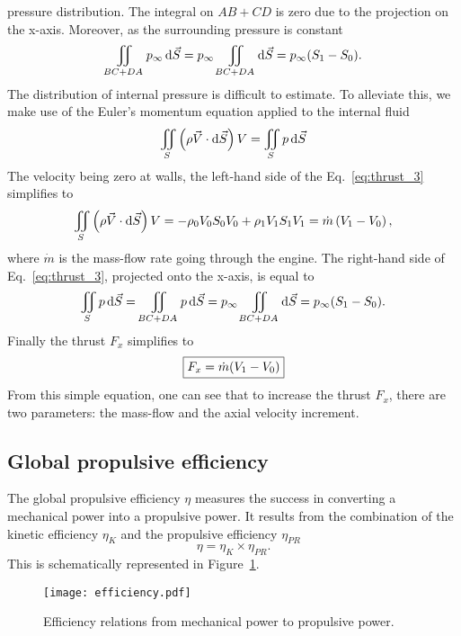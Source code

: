 pressure distribution. The integral on
$AB + CD$ is zero due to the projection on
the x-axis.
Moreover, as the surrounding pressure is constant
\begin{equation}
	\iint_{BC + DA} p_{\infty} \diff \vec{S} =
	p_{\infty} \iint_{BC + DA} \diff \vec{S} =
	p_{\infty} (S_{1} - S_{0}).
	\label{eq:thrust_2}
\end{equation}
The distribution of internal pressure is
difficult to estimate. To alleviate this, 
we make use of the Euler’s momentum 
equation applied to the internal fluid
\begin{equation}
	\iint_{S} \left(\rho \vec{V} \cdot \diff \vec{S} \right) V = 
	\iint_{S} p \diff \vec{S}
	\label{eq:thrust_3}
\end{equation}
The velocity being zero at walls, 
the left-hand side of the Eq.~\eqref{eq:thrust_3}
simplifies to
\begin{equation}
	\iint_{S} \left(\rho \vec{V} \cdot \mathop{}\!\mathrm{d} \vec{S} \right) V =
	- \rho_0 V_0 S_0 V_0 +  \rho_1 V_1 S_1 V_1 = 
	\dot{m} \left( V_{1} - V_{0} \right),
\end{equation}
where $\dot{m}$ is the mass-flow rate going through the engine.
The right-hand side of Eq.~\eqref{eq:thrust_3}, projected onto
the x-axis, is equal to 
\begin{equation}
	\iint_{S} p \mathop{}\!\mathrm{d} \vec{S} = 
	\iint_{BC + DA} p \mathop{}\!\mathrm{d} \vec{S} = 
	p_{\infty} \iint_{BC + DA} \mathop{}\!\mathrm{d} \vec{S} =
	p_{\infty} (S_{1} - S_{0}).
\end{equation}
Finally the thrust $F_x$ simplifies to
\begin{equation}
	\fbox{$
	F_x = \dot{m} (V_{1} - V_{0})
	$}
	\label{eq:cror_thrust}
\end{equation}
From this simple equation,
one can see that to increase the thrust $F_x$, there are two parameters:
the mass-flow and the axial velocity increment.

\subsection{Global propulsive efficiency}
\label{sub:cror_efficiency}

The global propulsive efficiency $\eta$ measures the 
success in converting a mechanical power into a
propulsive power. It results from the combination
of the kinetic efficiency $\eta_{K}$ and the propulsive efficiency
$\eta_{PR}$
\begin{equation}
	\eta = \eta_{K} \times \eta_{PR}.
\end{equation}
This is schematically represented in Figure~\ref{fig:cror_efficiency}.
\begin{figure}[htp]
  \centering
  \texttt{[image: efficiency.pdf]}
  \caption{Efficiency relations from mechanical power to propulsive power.}
  \label{fig:cror_efficiency}
\end{figure}

